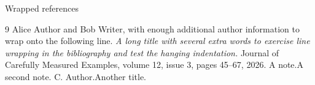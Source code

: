\documentclass{beamer}
\begin{document}
\begin{frame}{Wrapped references}
\small
\begin{thebibliography}{9}
 Alice Author and Bob Writer, with enough additional author information to wrap onto the following line.
\newblock \emph{A long title with several extra words to exercise line wrapping in the bibliography and test the hanging indentation.}
\newblock Journal of Carefully Measured Examples, volume 12, issue 3, pages 45--67, 2026.
\newblock A note.\newblock A second note.
 C. Author.\newblock Another title.
\end{thebibliography}
\end{frame}
\end{document}
